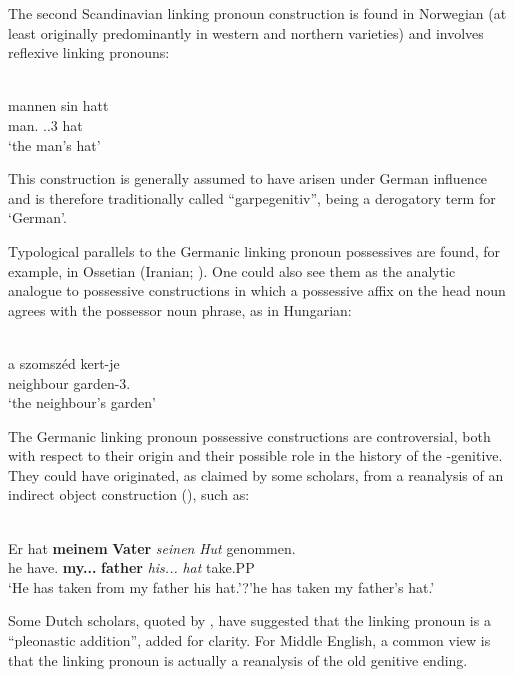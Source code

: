 The second Scandinavian linking pronoun construction is found in Norwegian (at least originally predominantly in western and northern varieties) and involves reflexive linking pronouns:

\ea\label{}
\\
\gll mannen  sin  hatt\\
man.{}  {\poss}.{}.3{\sg}  hat\\
\glt ‘the man’s hat’
\z

This construction is generally assumed to have arisen under German influence and is therefore traditionally called “garpegenitiv”,  being a derogatory term for ‘German’.

Typological parallels to the Germanic linking pronoun possessives are found, for example, in Ossetian (Iranian; \citealt[669]{KoptjevskajaTamm2003}). One could also see them as the analytic analogue to possessive constructions in which a possessive affix on the head noun agrees with the possessor noun phrase, as in Hungarian:

\ea\label{}
\\
\gll a  szomszéd  kert-je\\
{}  neighbour  garden-3{\sg}.{\poss}\\
\glt ‘the neighbour’s garden’ \citep[648]{KoptjevskajaTamm2003} 
\z

The Germanic linking pronoun possessive constructions are controversial, both with respect to their origin and their possible role in the history of the -genitive. They could have originated, as claimed by some scholars, from a reanalysis of an indirect object construction (\citet[638]{Behaghel1923}), such as:

\ea\label{}
\\
\gll Er  hat  \textbf{meinem} \textbf{Vater} \textit{seinen}\textit{  Hut}\textit{  }genommen.\\
he  have.{\prs}  \textbf{my.{\dat}.{\m}.{\sg}} \textbf{father} \textit{his.{\acc}.{\m}.{\sg}}\textit{  }\textit{hat}\textit{  }take.PP\\
\glt ‘He has taken from my father his hat.’?’he has taken my father’s hat.’
\z

Some Dutch scholars, quoted by \citet[58]{Norde1997}, have suggested that the linking pronoun is a “pleonastic addition”, added for clarity. For Middle English, a common view is that the linking pronoun  is actually a reanalysis of the old genitive ending.

